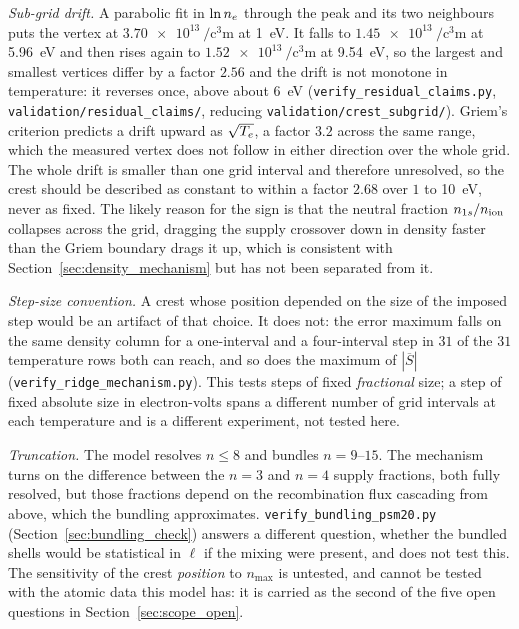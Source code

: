 \emph{Sub-grid drift.} A parabolic fit in $\ln n_e$ through the peak and its two
neighbours puts the vertex at $\SI{3.70e13}{\per\cubic\centi\metre}$ at
\SI{1}{\electronvolt}. It falls to $\SI{1.45e13}{\per\cubic\centi\metre}$ at
\SI{5.96}{\electronvolt} and then rises again to
$\SI{1.52e13}{\per\cubic\centi\metre}$ at \SI{9.54}{\electronvolt}, so the
largest and smallest vertices differ by a factor $2.56$ and the drift is not
monotone in temperature: it reverses once, above about \SI{6}{\electronvolt}
(\texttt{verify\_residual\_claims.py},
\texttt{validation/residual\_claims/}, reducing
\texttt{validation/crest\_subgrid/}). Griem's criterion predicts a drift upward
as $\sqrt{T_e}$, a factor $3.2$ across the same range, which the measured
vertex does not follow in either direction over the whole grid. The whole drift is smaller than one grid
interval and therefore unresolved, so the crest should be described as constant
to within a factor $2.68$ over $1$ to \SI{10}{\electronvolt}, never as fixed.
The likely reason for the sign is that the neutral fraction $n_{1s}/n_{\mathrm{ion}}$
collapses across the grid, dragging the supply crossover down in density faster
than the Griem boundary drags it up, which is consistent with
Section~\ref{sec:density_mechanism} but has not been separated from it.

\emph{Step-size convention.} A crest whose position depended on the size of the
imposed step would be an artifact of that choice. It does not: the error
maximum falls on the same density column for a one-interval and a four-interval
step in $31$ of the $31$ temperature rows both can reach, and so does the
maximum of $|\overline{S}|$ (\texttt{verify\_ridge\_mechanism.py}). This tests
steps of fixed \emph{fractional} size; a step of fixed absolute size in
electron-volts spans a different number of grid intervals at each temperature
and is a different experiment, not tested here.

\emph{Truncation.} The model resolves $n\le8$ and bundles $n=9$--$15$. The
mechanism turns on the difference between the $n=3$ and $n=4$ supply fractions,
both fully resolved, but those fractions depend on the recombination flux
cascading from above, which the bundling approximates.
\texttt{verify\_bundling\_psm20.py} (Section~\ref{sec:bundling_check}) answers
a different question, whether the bundled shells would be statistical in $\ell$
if the mixing were present, and does not test this. The sensitivity of the
crest \emph{position} to $n_{\max}$ is untested, and cannot be tested with the
atomic data this model
has: it is carried as the second of the five open questions in
Section~\ref{sec:scope_open}.

